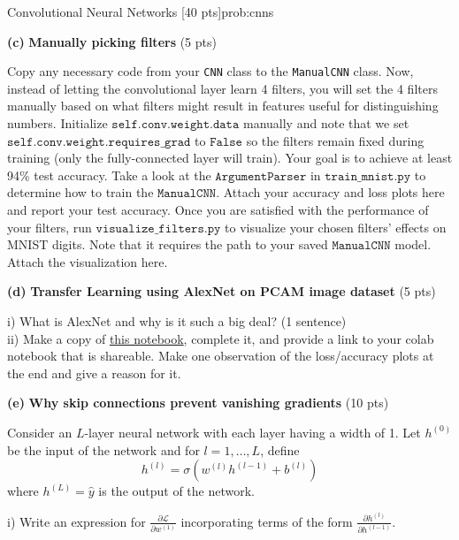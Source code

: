 \begin{problem}{Convolutional Neural Networks \hfill [40 pts]}{prob:cnns}
\begin{adjustwidth}{2em}{2em}
    \textbf{(c)} \textbf{Manually picking filters} \hfill (5 pts)
    \begin{adjustwidth}{2em}{2em}
    Copy any necessary code from your \texttt{CNN} class to the \texttt{ManualCNN} class. Now, instead of letting the convolutional layer learn 4 filters, you will set the 4 filters manually based on what filters might result in features useful for distinguishing numbers. Initialize $\texttt{self.conv.weight.data}$ manually and note that we set $\texttt{self.conv.weight.requires\_grad}$ to $\texttt{False}$ so the filters remain fixed during training (only the fully-connected layer will train). Your goal is to achieve at least 94\% test accuracy. Take a look at the $\texttt{ArgumentParser}$ in $\texttt{train\_mnist.py}$ to determine how to train the $\texttt{ManualCNN}$. Attach your accuracy and loss plots here and report your test accuracy. Once you are satisfied with the performance of your filters, run $\texttt{visualize\_filters.py}$ to visualize your chosen filters' effects on MNIST digits. Note that it requires the path to your saved $\texttt{ManualCNN}$ model. Attach the visualization here.\\
    \end{adjustwidth}
    \vspace{5px}
    \textbf{(d)} \textbf{Transfer Learning using AlexNet on PCAM image dataset} \hfill (5 pts)
    \begin{adjustwidth}{2em}{2em}
        i) What is AlexNet and why is it such a big deal? (1 sentence) \\

        ii) Make a copy of \href{https://colab.research.google.com/drive/1HnRFDWtVqBgMh-9sSF1WnHwGJQ5bvLXF?usp=sharing}{this notebook}, complete it, and provide a link to your colab notebook that is shareable. Make one observation of the loss/accuracy plots at the end and give a reason for it.  \\
    \end{adjustwidth}
    \textbf{(e)} \textbf{Why skip connections prevent vanishing gradients} \hfill (10 pts)
    \begin{adjustwidth}{2em}{2em}

    Consider an $L$-layer neural network with each layer having a width of 1. Let $h^{(0)}$ be the input of the network and for $l = 1, \dots, L$, define
    $$h^{(l)} = \sigma(w^{(l)}h^{(l - 1)} + b^{(l)})$$
    where $h^{(L)} = \hat{y}$ is the output of the network.

    i) Write an expression for $\frac{\partial \mathcal{L}}{\partial w^{(1)}}$ incorporating terms of the form $\frac{\partial h^{(l)}}{\partial h^{(l-1)}}$. \\


\end{adjustwidth}
\end{adjustwidth}
\end{problem}
